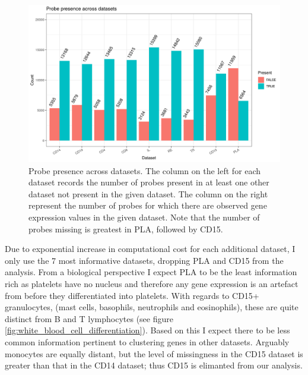 \documentclass[12pt]{article} %
\begin{document}
	\begin{figure}
		\centering
		\includegraphics[scale=0.9 ]{Images/Data_inspection/probe_presence_across_datasets_no_all.png}
		\caption{Probe presence across datasets. The column on the left for each dataset records the number of probes present in at least one other dataset not present in the given dataset. The column on the right represent the number of probes for which there are observed gene expression values  in the given dataset. Note that the number of probes missing is greatest in PLA, followed by CD15.}
		\label{fig:probe_presence_across_datasets}
	\end{figure}
	
	
	Due to exponential increase in computational cost for each additional dataset, I only use the 7 most informative datasets, dropping PLA and CD15 from the analysis. From a biological perspective I expect PLA to be the least information rich as platelets have no nucleus \citep{Wrighthistogenesisbloodplatelets1910} and therefore any gene expression is an artefact from before they differentiated into platelets. With regards to CD15+ granulocytes, (mast cells, basophils, neutrophils and eosinophils), these are quite distinct from B and T lymphocytes (see figure \ref{fig:white_blood_cell_differentiation}). Based on this I expect there to be less common information pertinent to clustering genes in other datasets. Arguably monocytes are equally distant, but the level of missingness in the CD15 dataset is greater than that in the CD14 dataset; thus CD15 is elimanted from our analysis.
\end{document}
